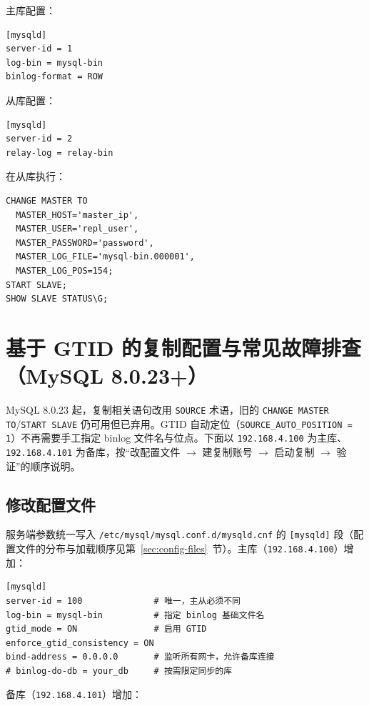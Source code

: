 \documentclass[12pt,UTF8]{ctexbook}
\begin{document}
主库配置：

\begin{lstlisting}
[mysqld]
server-id = 1
log-bin = mysql-bin
binlog-format = ROW
\end{lstlisting}

从库配置：

\begin{lstlisting}
[mysqld]
server-id = 2
relay-log = relay-bin
\end{lstlisting}

在从库执行：

\begin{lstlisting}
CHANGE MASTER TO
  MASTER_HOST='master_ip',
  MASTER_USER='repl_user',
  MASTER_PASSWORD='password',
  MASTER_LOG_FILE='mysql-bin.000001',
  MASTER_LOG_POS=154;
START SLAVE;
SHOW SLAVE STATUS\G;
\end{lstlisting}

\section{基于 GTID 的复制配置与常见故障排查（MySQL 8.0.23+）}
\label{sec:gtid-replication-troubleshooting}

MySQL 8.0.23 起，复制相关语句改用 \texttt{SOURCE} 术语，旧的 \texttt{CHANGE MASTER TO}/\texttt{START SLAVE} 仍可用但已弃用。GTID 自动定位（\texttt{SOURCE\_AUTO\_POSITION = 1}）不再需要手工指定 binlog 文件名与位点。下面以 \texttt{192.168.4.100} 为主库、\texttt{192.168.4.101} 为备库，按“改配置文件 $\to$ 建复制账号 $\to$ 启动复制 $\to$ 验证”的顺序说明。

\subsection{修改配置文件}

服务端参数统一写入 \texttt{/etc/mysql/mysql.conf.d/mysqld.cnf} 的 \texttt{[mysqld]} 段（配置文件的分布与加载顺序见第~\ref{sec:config-files}~节）。主库（\texttt{192.168.4.100}）增加：

\begin{lstlisting}
[mysqld]
server-id = 100              # 唯一，主从必须不同
log-bin = mysql-bin          # 指定 binlog 基础文件名
gtid_mode = ON               # 启用 GTID
enforce_gtid_consistency = ON
bind-address = 0.0.0.0       # 监听所有网卡，允许备库连接
# binlog-do-db = your_db     # 按需限定同步的库
\end{lstlisting}

备库（\texttt{192.168.4.101}）增加：
\end{document}
